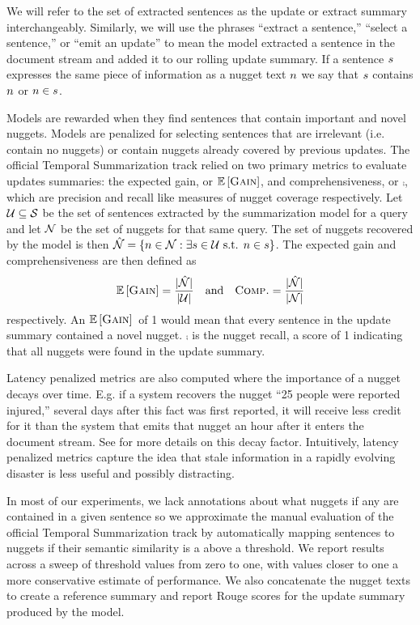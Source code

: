 We will refer to the set of extracted sentences as the update or extract
summary interchangeably. Similarly, we will use the phrases ``extract a 
sentence,''
``select a sentence,'' or ``emit an update'' to mean the model extracted a 
sentence in the 
document stream and added it to our rolling update summary. 
If a sentence $s$ 
expresses the same piece of information as a nugget text $n$ 
we say that $s$ contains $n$ or $n \in s$.

Models are rewarded when they find sentences that contain important and novel
nuggets. Models are penalized for 
selecting sentences that are irrelevant (i.e. contain no nuggets) or 
contain nuggets already covered by previous updates. 
   The official Temporal Summarization track relied on two primary metrics to 
evaluate updates summaries: the expected gain, or $\mathbb{E}\left[\textsc{Gain}\right]$, and 
comprehensiveness, or $\comp$, which are precision and recall like measures of nugget coverage respectively. Let $\mathcal{U} \subseteq \mathcal{S}$ be the set 
of sentences extracted by the summarization model for a query and let 
$\mathcal{N}{}$ be the set of nuggets for that same query. The set of nuggets
recovered by the model is then $\hat{\mathcal{N}} = \{n \in \mathcal{N} :
\exists s \in \mathcal{U} \textrm{ s.t. } n \in s \}$.
The expected gain and comprehensiveness are then defined as 
    \[ \mathbb{E}\left[\textsc{Gain}\right] = \frac{|\hat{\mathcal{N}}|}{|\mathcal{U}|} 
            \quad \textrm{and} \quad 
        \textsc{Comp.} = \frac{|\hat{\mathcal{N}}|}{|\mathcal{N}|} \]
    respectively. 
    An $\mathbb{E}\left[\textsc{Gain}\right]{}$ of 1 would mean that every sentence in
    the update summary contained a novel nugget. $\comp{}$ is the 
    nugget recall, a score of 1 indicating that all nuggets were found
    in the update summary.
 
Latency penalized metrics are also computed where
the importance of a nugget decays over time. E.g. if a system
recovers the nugget ``25 people were reported injured,'' several days
after this fact was first reported, it will receive less credit for it
than the system that emits that nugget an hour after it enters the 
document stream. See \cite{aslam2014trec} for more details on this decay 
factor. Intuitively, latency penalized metrics capture the idea that stale
information in a rapidly evolving disaster is less useful and possibly
distracting.

 In most of our experiments, we lack annotations about what nuggets if 
 any are contained in a given sentence so we 
  approximate the manual evaluation of the official Temporal Summarization
  track
   by automatically mapping sentences to nuggets if their semantic similarity
   \citep{guo2012simple}
   is a above a threshold. We report results across a sweep of threshold 
   values from zero to one, with values closer to one a more conservative
   estimate of performance. 
   We also concatenate the nugget texts to create a reference summary and
   report Rouge scores \citep{lin2004rouge} for the update summary produced
    by the model.

